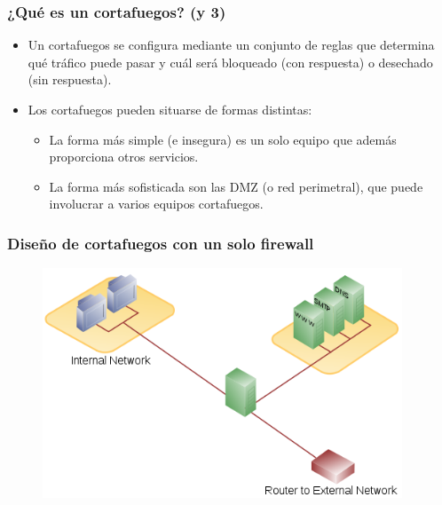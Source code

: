 \documentclass{beamer}
\begin{document}

\begin{frame}
\frametitle{¿Qué es un cortafuegos? (y 3)}

\begin{itemize}
\item Un cortafuegos se configura mediante un conjunto de reglas que determina qué tráfico puede pasar y cuál será bloqueado (con respuesta) o desechado (sin respuesta).
\item Los cortafuegos pueden situarse de formas distintas: 
	\begin{itemize}
	\item La forma más simple (e insegura) es un solo equipo que además proporciona otros servicios.
	\item La forma más sofisticada son las DMZ (o red perimetral), que puede involucrar a varios equipos cortafuegos. 
	\end{itemize}
\end{itemize}

\end{frame}


\begin{frame}
\frametitle{Diseño de cortafuegos con un solo firewall}

\begin{figure}[h]

\begin{center}
  \centering
  \includegraphics[height=2.7in]{figs/500px-DMZ_network_diagram_1_firewall.png}
\end{center}
\end{figure}

\end{frame}
\end{document}
